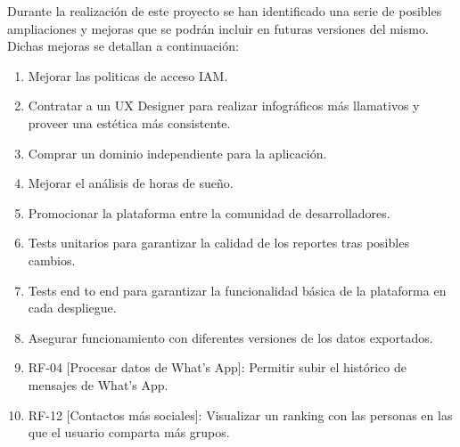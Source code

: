 
Durante la realización de este proyecto se han identificado una serie de posibles ampliaciones y mejoras que se podrán incluir en futuras versiones del mismo. Dichas mejoras se detallan a continuación:

\begin{enumerate}
    \item Mejorar las politicas de acceso IAM.
    \item Contratar a un UX Designer para realizar infográficos más llamativos y proveer una estética más consistente.
    \item Comprar un dominio independiente para la aplicación.
    \item Mejorar el análisis de horas de sueño.
    \item Promocionar la plataforma entre la comunidad de desarrolladores.
    \item Tests unitarios para garantizar la calidad de los reportes tras posibles cambios.
    \item Tests end to end para garantizar la funcionalidad básica de la plataforma en cada despliegue.
    \item Asegurar funcionamiento con diferentes versiones de los datos exportados.
    \item RF-04 [Procesar datos de What's App]: Permitir subir el histórico de mensajes de What's App.
    \item RF-12 [Contactos más sociales]: Visualizar un ranking con las personas en las que el usuario comparta más grupos.
\end{enumerate}
